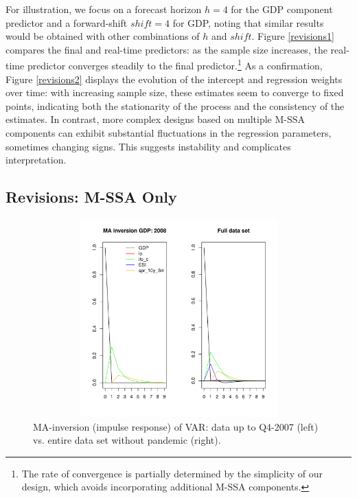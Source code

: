\documentclass[11pt,a4paper]{article}
\begin{document}
For illustration, we focus on a forecast horizon $h=4$ for the GDP component predictor and a forward-shift $shift=4$ for GDP, noting that similar results would be obtained with other combinations of $h$ and $shift$. 
Figure \eqref{revisions1} compares the final and real-time predictors: as the sample size increases, the real-time predictor converges steadily to the final predictor.\footnote{The rate of convergence is partially determined by the simplicity of our design, which avoids incorporating additional M-SSA components.} 
As a confirmation, Figure \eqref{revisions2} displays the evolution of the intercept and regression weights over time: with increasing sample size, these estimates seem to converge to fixed points, indicating both the stationarity of the process and the consistency of the estimates. %
In contrast, more complex designs based on multiple M-SSA components can exhibit substantial fluctuations in the regression parameters, sometimes changing signs. This suggests instability and complicates interpretation.

\subsection{Revisions: M-SSA Only}


\begin{figure}[h!]
    \begin{center}
        \includegraphics[height=3in, width=4.5in]{./Figures/up_dated_ma_inv_multi_ip.pdf}
        \caption{MA-inversion (impulse response) of VAR: data up to Q4-2007 (left) vs. entire data set without pandemic (right).
        \label{up_dated_ma_inv_multi_ip}}
    \end{center}
\end{figure}
\end{document}
